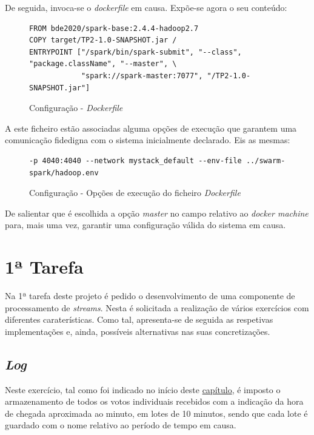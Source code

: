 \documentclass[a4paper]{report}
\begin{document}
            De seguida, invoca-se o \textit{dockerfile} em causa. Expõe-se agora o seu conteúdo:
            \begin{figure}[H]
                \centering
                \begin{verbatim}
FROM bde2020/spark-base:2.4.4-hadoop2.7
COPY target/TP2-1.0-SNAPSHOT.jar /
ENTRYPOINT ["/spark/bin/spark-submit", "--class", "package.className", "--master", \
            "spark://spark-master:7077", "/TP2-1.0-SNAPSHOT.jar"]
                \end{verbatim}
                \vspace{-5mm}
                \caption{Configuração - \textit{Dockerfile}}
                \label{fig:15}
            \end{figure}

            A este ficheiro estão associadas alguma opções de execução que garantem uma comunicação fidedigna com o sistema inicialmente declarado. Eis as mesmas:
            \begin{figure}[H]
                \centering
                \begin{verbatim}
-p 4040:4040 --network mystack_default --env-file ../swarm-spark/hadoop.env
                \end{verbatim}
                \vspace{-5mm}
                \caption{Configuração - Opções de execução do ficheiro \textit{Dockerfile}}
                \label{fig:16}
            \end{figure}

            De salientar que é escolhida a opção \textsl{master} no campo relativo ao \textit{docker machine} para, mais uma vez, garantir uma configuração válida do sistema em causa.

    \section{1ª Tarefa} \label{sec:Task1}
        Na 1ª tarefa deste projeto é pedido o desenvolvimento de uma componente de processamento de \textit{streams}. Nesta é solicitada a realização de vários exercícios com diferentes caraterísticas. Como tal, apresenta-se de seguida as respetivas implementações e, ainda, possíveis alternativas nas suas concretizações.

        \subsection{\textit{Log}} \label{subsec:Task1-Log}
            Neste exercício, tal como foi indicado no início deste \hyperref[ch:Implementation]{capítulo}, é imposto o armazenamento de todos os votos individuais recebidos com a indicação da hora de chegada aproximada ao minuto, em lotes de 10 minutos, sendo que cada lote é guardado com o nome relativo ao período de tempo em causa.
\end{document}
